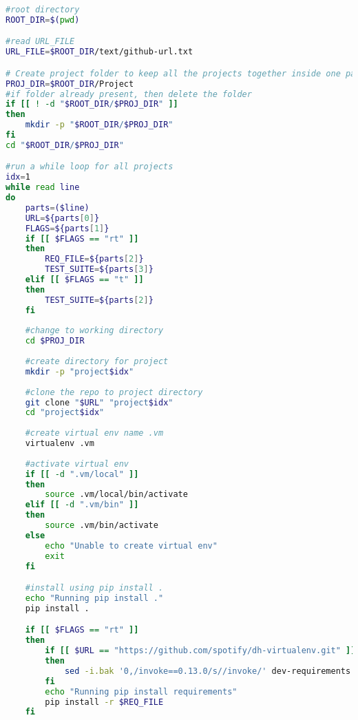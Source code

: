 \lstset{numbers=left, numberstyle=\tiny, stepnumber=1, numbersep=5pt, columns=flexible, breaklines=true, numberblanklines=false}
\lstset{basicstyle=\ttfamily}
\lstset{frame=tb}

\begin{lstlisting}[caption=Bash Script for Project Selection,label=code:project_selection_automation.sh,language=Bash]
#root directory
ROOT_DIR=$(pwd)

#read URL_FILE
URL_FILE=$ROOT_DIR/text/github-url.txt

# Create project folder to keep all the projects together inside one parent folder
PROJ_DIR=$ROOT_DIR/Project
#if folder already present, then delete the folder
if [[ ! -d "$ROOT_DIR/$PROJ_DIR" ]]
then
    mkdir -p "$ROOT_DIR/$PROJ_DIR" 
fi
cd "$ROOT_DIR/$PROJ_DIR"

#run a while loop for all projects
idx=1
while read line
do
    parts=($line)
    URL=${parts[0]}
    FLAGS=${parts[1]}
    if [[ $FLAGS == "rt" ]]
    then
        REQ_FILE=${parts[2]}
        TEST_SUITE=${parts[3]}
    elif [[ $FLAGS == "t" ]]
    then
        TEST_SUITE=${parts[2]}
    fi
    
    #change to working directory
    cd $PROJ_DIR
    
    #create directory for project
    mkdir -p "project$idx"
    
    #clone the repo to project directory
    git clone "$URL" "project$idx"
    cd "project$idx"
    
    #create virtual env name .vm
    virtualenv .vm
    
    #activate virtual env
    if [[ -d ".vm/local" ]]
    then
        source .vm/local/bin/activate
    elif [[ -d ".vm/bin" ]]
    then
        source .vm/bin/activate
    else
        echo "Unable to create virtual env"
        exit
    fi

    #install using pip install . 
    echo "Running pip install ."
    pip install .

    if [[ $FLAGS == "rt" ]]
    then
        if [[ $URL == "https://github.com/spotify/dh-virtualenv.git" ]]
        then
            sed -i.bak '0,/invoke==0.13.0/s//invoke/' dev-requirements.txt  #fix for dependency conflict issue
        fi
        echo "Running pip install requirements"
        pip install -r $REQ_FILE
    fi


\end{lstlisting}
